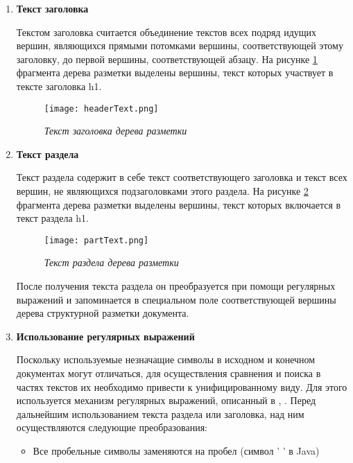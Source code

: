 \begin{enumerate}
\item \textbf{Текст заголовка}

Текстом заголовка считается объединение текстов всех подряд идущих вершин, являющихся прямыми потомками вершины, соответствующей этому заголовку, до первой вершины, соответствующей абзацу. На рисунке \ref{sys:headertext} фрагмента дерева разметки выделены вершины, текст которых участвует в тексте заголовка h1.

\begin{figure}[h]
\begin{center}
\texttt{[image: headerText.png]}
\caption{\emph{Текст заголовка дерева разметки}}
\label{sys:headertext}
\end{center}
\end{figure}

\item \textbf{Текст раздела}

Текст раздела содержит в себе текст соответствующего заголовка и текст всех вершин, не являющихся подзаголовками этого раздела. На рисунке \ref{sys:parttext} фрагмента дерева разметки выделены вершины, текст которых включается в текст раздела h1.

\begin{figure}[h]
\begin{center}
\texttt{[image: partText.png]}
\caption{\emph{Текст раздела дерева разметки}}
\label{sys:parttext}
\end{center}
\end{figure}

После получения текста раздела он преобразуется при помощи регулярных выражений и запоминается в специальном поле соответствующей вершины дерева структурной разметки документа.

\item \textbf{Использование регулярных выражений}

Поскольку используемые незначащие символы в исходном и конечном документах могут отличаться, для осуществления сравнения и поиска в частях текстов их необходимо привести к унифицированному виду. Для этого используется механизм регулярных выражений, описанный в \cite{book:RegExp}, \cite{web:Reg}. Перед дальнейшим использованием текста раздела или заголовка, над ним осуществляются следующие преобразования:

\begin{itemize}
\item Все пробельные символы заменяются на пробел (символ ' ' в Java)


\end{itemize}
\end{enumerate}
